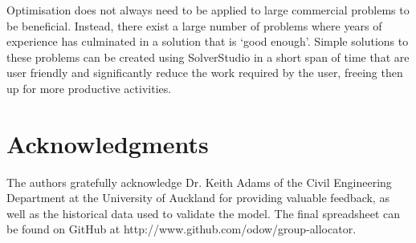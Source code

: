 \documentclass[12pt]{ORSNZ}
\begin{document}
Optimisation does not always need to be applied to large commercial problems to be beneficial. Instead, there exist a large number of problems where years of experience has culminated in a solution that is `good enough'. Simple solutions to these problems can be created using SolverStudio in a short span of time that are user friendly and significantly reduce the work required by the user, freeing then up for more productive activities.

\section*{Acknowledgments}
The authors gratefully acknowledge Dr. Keith Adams of the Civil Engineering Department at the University of Auckland for providing valuable feedback, as well as the historical data used to validate the model. The final spreadsheet can be found on GitHub at http://www.github.com/odow/group-allocator.



\end{document}
